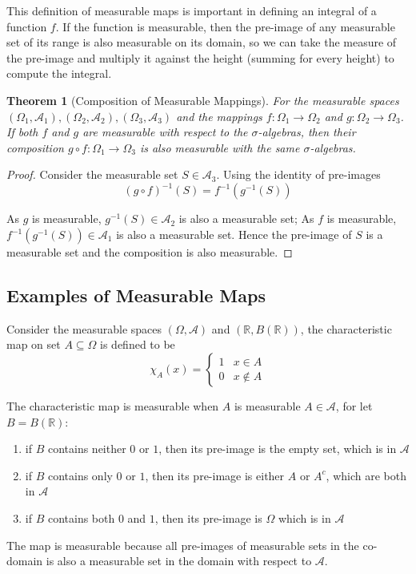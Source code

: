 \documentclass{article}
\newtheorem{theorem}{Theorem}[section]
\begin{document}
This definition of measurable maps is important in defining an integral of a function $f$. If the function is measurable, then the pre-image of any measurable set of its range is also measurable on its domain, so we can take the measure of the pre-image and multiply it against the height (summing for every height) to compute the integral.

\begin{theorem}[Composition of Measurable Mappings]
    For the measurable spaces $(\Omega_1, \mathcal A_1), (\Omega_2, \mathcal A_2), (\Omega_3, \mathcal A_3)$ and the mappings $f \colon \Omega_1 \to \Omega_2$ and $g \colon \Omega_2 \to \Omega_3$. If both $f$ and $g$ are measurable with respect to the $\sigma$-algebras, then their composition $g \circ f \colon \Omega_1 \to \Omega_3$ is also measurable with the same $\sigma$-algebras.
\end{theorem}
\begin{proof}
    Consider the measurable set $S \in \mathcal A_3$. Using the identity of pre-images
    \[
        (g \circ f)^{-1}(S) = f^{-1}(g^{-1}(S))
    \]

    As $g$ is measurable, $g^{-1}(S) \in \mathcal A_2$ is also a measurable set; As $f$ is measurable, $f^{-1}(g^{-1}(S)) \in \mathcal A_1$ is also a measurable set. Hence the pre-image of $S$ is a measurable set and the composition is also measurable.
\end{proof}



\subsection{Examples of Measurable Maps}
Consider the measurable spaces $(\Omega, \mathcal A)$ and $(\mathbb{R}, B(\mathbb{R}))$, the characteristic map on set $A \subseteq \Omega$ is defined to be
\[
    \chi_A(x) = \begin{cases}
        1 & x \in A\\
        0 & x \not\in A
    \end{cases}
\]

The characteristic map is measurable when $A$ is measurable $A \in \mathcal A$, for let $B = B(\mathbb{R})$:
\begin{enumerate}
    \item if $B$ contains neither $0$ or $1$, then its pre-image is the empty set, which is in $\mathcal A$
    \item if $B$ contains only $0$ or $1$, then its pre-image is either $A$ or $A^c$, which are both in $\mathcal A$
    \item if $B$ contains both $0$ and $1$, then its pre-image is $\Omega$ which is in $\mathcal A$
\end{enumerate}
The map is measurable because all pre-images of measurable sets in the co-domain is also a measurable set in the domain with respect to $\mathcal A$.
\end{document}
